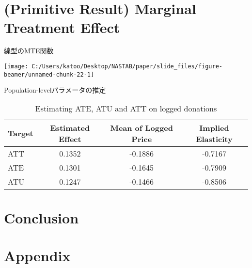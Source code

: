 \documentclass[
  ignorenonframetext,
  aspectratio=169,
]{beamer}
\begin{document}
\hypertarget{primitive-result-marginal-treatment-effect}{%
\section{(Primitive Result) Marginal Treatment Effect}\label{primitive-result-marginal-treatment-effect}}

\begin{frame}{線型のMTE関数}
\protect\hypertarget{ux7ddaux578bux306emteux95a2ux6570}{}
\begin{center}\texttt{[image: C:/Users/katoo/Desktop/NASTAB/paper/slide\_files/figure-beamer/unnamed-chunk-22-1]} \end{center}
\end{frame}

\begin{frame}{Population-levelパラメータの推定}
\protect\hypertarget{population-levelux30d1ux30e9ux30e1ux30fcux30bfux306eux63a8ux5b9a}{}
\begin{table}

\caption{\label{tab:unnamed-chunk-23}Estimating ATE, ATU and ATT on logged donations}
\centering
\fontsize{7}{9}\selectfont
\begin{tabular}[t]{lccc}
\toprule
Target & Estimated Effect & Mean of Logged Price & Implied Elasticity\\
\midrule
ATT & 0.1352 & -0.1886 & -0.7167\\
ATE & 0.1301 & -0.1645 & -0.7909\\
ATU & 0.1247 & -0.1466 & -0.8506\\
\bottomrule
\end{tabular}
\end{table}
\end{frame}

\hypertarget{conclusion}{%
\section{Conclusion}\label{conclusion}}

\hypertarget{appendix}{%
\section{Appendix}\label{appendix}}
\end{document}
